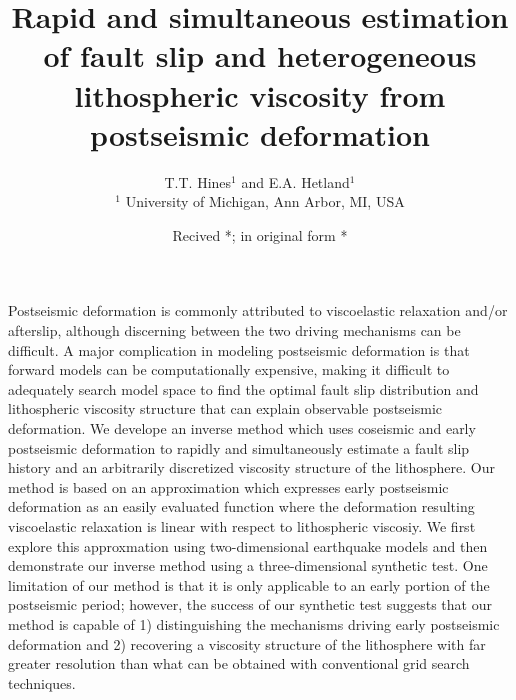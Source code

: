 \documentclass[extra]{gji}
\title[Estimation of slip and viscosity from postseismic
  deformation]{Rapid and simultaneous estimation of fault slip and
  heterogeneous lithospheric viscosity from postseismic deformation}
\author[T.T. Hines and E.A Hetland]{T.T. Hines$^1$ and
  E.A. Hetland$^1$\\ $^1$ University of Michigan, Ann Arbor, MI, USA}
\date{Recived *; in original form *}
\begin{document}
\label{firstpage}

\maketitle

\begin{summary}
Postseismic deformation is commonly attributed to viscoelastic
relaxation and/or afterslip, although discerning between the two
driving mechanisms can be difficult.  A major complication in modeling
postseismic deformation is that forward models can be computationally
expensive, making it difficult to adequately search model space to
find the optimal fault slip distribution and lithospheric viscosity
structure that can explain observable postseismic deformation.  We
develope an inverse method which uses coseismic and early postseismic
deformation to rapidly and simultaneously estimate a fault slip
history and an arbitrarily discretized viscosity structure of the
lithosphere. Our method is based on an approximation which expresses
early postseismic deformation as an easily evaluated function where
the deformation resulting viscoelastic relaxation is linear with
respect to lithospheric viscosiy.  We first explore this approxmation
using two-dimensional earthquake models and then demonstrate our
inverse method using a three-dimensional synthetic test.  One
limitation of our method is that it is only applicable to an early
portion of the postseismic period; however, the success of our
synthetic test suggests that our method is capable of 1) distinguishing the
mechanisms driving early postseismic deformation and 2) recovering a
viscosity structure of the lithosphere with far greater resolution
than what can be obtained with conventional grid search techniques.


\end{summary}

\begin{keywords}
\end{keywords}
\end{document}
